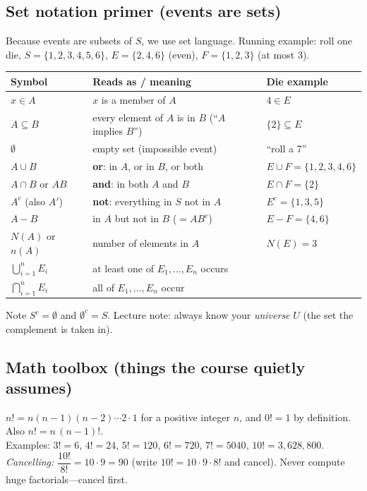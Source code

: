 \documentclass[11pt]{article}
\let\oldsubsection\subsection
\renewcommand{\subsection}{\Needspace{14\baselineskip}\oldsubsection}
\begin{document}
\subsection{Set notation primer (events are sets)}

Because events are subsets of $S$, we use set language. Running example: roll one die, $S=\{1,2,3,4,5,6\}$, $E=\{2,4,6\}$ (even), $F=\{1,2,3\}$ (at most 3).

\begin{center}
\renewcommand{\arraystretch}{1.25}
\begin{tabular}{@{}>{\raggedright\arraybackslash}p{1.3in}>{\raggedright\arraybackslash}p{2.7in}>{\raggedright\arraybackslash}p{2.2in}@{}}
\toprule
\textbf{Symbol} & \textbf{Reads as / meaning} & \textbf{Die example}\\
\midrule
$x\in A$ & $x$ is a member of $A$ & $4\in E$\\
$A\subseteq B$ & every element of $A$ is in $B$ (``$A$ implies $B$'') & $\{2\}\subseteq E$\\
$\emptyset$ & empty set (impossible event) & ``roll a 7''\\
$A\cup B$ & \textbf{or}: in $A$, or in $B$, or both & $E\cup F=\{1,2,3,4,6\}$\\
$A\cap B$ \;or\; $AB$ & \textbf{and}: in both $A$ and $B$ & $E\cap F=\{2\}$\\
$A^c$ (also $A'$) & \textbf{not}: everything in $S$ not in $A$ & $E^c=\{1,3,5\}$\\
$A-B$ & in $A$ but not in $B$ ($=AB^c$) & $E-F=\{4,6\}$\\
$N(A)$ or $n(A)$ & number of elements in $A$ & $N(E)=3$\\
$\bigcup_{i=1}^n E_i$ & at least one of $E_1,\dots,E_n$ occurs & \\
$\bigcap_{i=1}^n E_i$ & all of $E_1,\dots,E_n$ occur & \\
\bottomrule
\end{tabular}
\end{center}
Note $S^c=\emptyset$ and $\emptyset^c=S$. Lecture note: always know your \emph{universe} $U$ (the set the complement is taken in).

\subsection{Math toolbox (things the course quietly assumes)}

\begin{defbox}[Factorial]
$n!=n(n-1)(n-2)\cdots 2\cdot 1$ for a positive integer $n$, and $0!=1$ by definition. Also $n!=n\,(n-1)!$.\\
Examples: $3!=6$, $4!=24$, $5!=120$, $6!=720$, $7!=5040$, $10!=3{,}628{,}800$.\\
\emph{Cancelling:} $\dfrac{10!}{8!}=10\cdot 9=90$ (write $10!=10\cdot9\cdot8!$ and cancel). Never compute huge factorials---cancel first.
\end{defbox}
\end{document}
